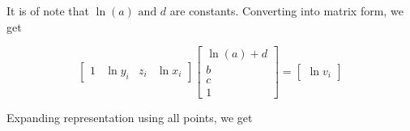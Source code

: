 \documentclass[12pt,a4paper]{article}
\begin{document}
\noindent It is of note that $\ln (a) \textrm{ and } d$ are constants. Converting into matrix form, we get


%
%


\begin{equation}
\left[\begin{array}{cccc} {1} & {\ln y_i} & {z_i} & {\ln x_i}\end{array} \right]
\left[\begin{array}{c}{\ln(a) + d}\\ {b} \\ {c} \\ {1} \end{array}\right] = \left[ \begin{array}{c}\ln v_i \end{array}\right]
\end{equation}

\noindent Expanding representation using all points, we get
%
\end{document}
